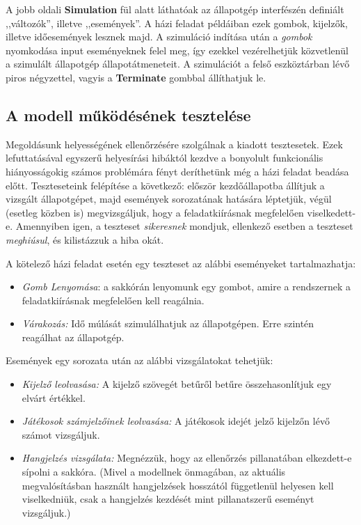 A jobb oldali \textbf{Simulation} fül alatt láthatóak az állapotgép interfészén definiált ,,változók'', illetve ,,események''. A házi feladat példáiban ezek gombok, kijelzők, illetve időesemények lesznek majd. A szimuláció indítása után a \emph{gombok} nyomkodása input eseményeknek felel meg, így ezekkel vezérelhetjük közvetlenül a szimulált állapotgép állapotátmeneteit. A szimulációt a felső eszköztárban lévő piros négyzettel, vagyis a \textbf{Terminate} gombbal állíthatjuk le.


\subsection{A modell működésének tesztelése}

Megoldásunk helyességének ellenőrzésére szolgálnak a kiadott tesztesetek. Ezek lefuttatásával egyszerű helyesírási hibáktól kezdve a bonyolult funkcionális hiányosságokig számos problémára fényt deríthetünk még a házi feladat beadása előtt. Teszteseteink felépítése a következő: először kezdőállapotba állítjuk a vizsgált állapotgépet, majd események sorozatának hatására léptetjük, végül (esetleg közben is) megvizsgáljuk, hogy a feladatkiírásnak megfelelően viselkedett-e. Amennyiben igen, a teszteset \emph{sikeresnek} mondjuk, ellenkező esetben a teszteset \emph{meghiúsul}, és kilistázzuk a hiba okát.

A kötelező házi feladat esetén egy teszteset az alábbi eseményeket tartalmazhatja:

\begin{itemize}
	\item \emph{Gomb Lenyomása}: a sakkórán lenyomunk egy gombot, amire a rendszernek a feladatkiírásnak megfelelően kell reagálnia.
	\item \emph{Várakozás:} Idő múlását szimulálhatjuk az állapotgépen. Erre szintén reagálhat az állapotgép.
\end{itemize}

Események egy sorozata után az alábbi vizsgálatokat tehetjük:

\begin{itemize}
	\item \emph{Kijelző leolvasása:} A kijelző szövegét betűről betűre összehasonlítjuk egy elvárt értékkel.
	\item \emph{Játékosok számjelzőinek leolvasása:} A játékosok idejét jelző kijelzőn lévő számot vizsgáljuk.
	\item \emph{Hangjelzés vizsgálata:} Megnézzük, hogy az ellenőrzés pillanatában elkezdett-e sípolni a sakkóra. (Mivel a modellnek önmagában, az aktuális megvalósításban használt hangjelzések hosszától függetlenül helyesen kell viselkedniük, csak a hangjelzés kezdését mint pillanatszerű eseményt vizsgáljuk.)
\end{itemize}

